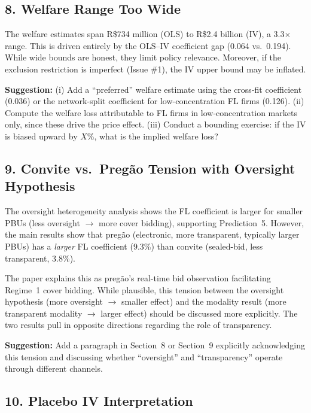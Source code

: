 \documentclass[12pt]{article}
\begin{document}
\subsection*{8. Welfare Range Too Wide}

The welfare estimates span R\$734 million (OLS) to R\$2.4 billion (IV),
a 3.3$\times$ range. This is driven entirely by the OLS--IV coefficient
gap (0.064 vs.\ 0.194). While wide bounds are honest, they limit policy
relevance. Moreover, if the exclusion restriction is imperfect (Issue
\#1), the IV upper bound may be inflated.

\noindent\textbf{Suggestion:} (i) Add a ``preferred'' welfare estimate
using the cross-fit coefficient (0.036) or the network-split coefficient
for low-concentration FL firms (0.126). (ii) Compute the welfare loss
attributable to FL firms in low-concentration markets only, since these
drive the price effect. (iii) Conduct a bounding exercise: if the IV is
biased upward by $X$\%, what is the implied welfare loss?

\subsection*{9. Convite vs.\ Preg\~ao Tension with Oversight Hypothesis}

The oversight heterogeneity analysis shows the FL coefficient is larger
for smaller PBUs (less oversight $\rightarrow$ more cover bidding),
supporting Prediction~5. However, the main results show that preg\~ao
(electronic, more transparent, typically larger PBUs) has a \emph{larger}
FL coefficient (9.3\%) than convite (sealed-bid, less transparent, 3.8\%).

The paper explains this as preg\~ao's real-time bid observation
facilitating Regime~1 cover bidding. While plausible, this tension
between the oversight hypothesis (more oversight $\rightarrow$ smaller
effect) and the modality result (more transparent modality
$\rightarrow$ larger effect) should be discussed more explicitly. The
two results pull in opposite directions regarding the role of
transparency.

\noindent\textbf{Suggestion:} Add a paragraph in Section~8 or
Section~9 explicitly acknowledging this tension and discussing whether
``oversight'' and ``transparency'' operate through different channels.

\subsection*{10. Placebo IV Interpretation}
\end{document}
